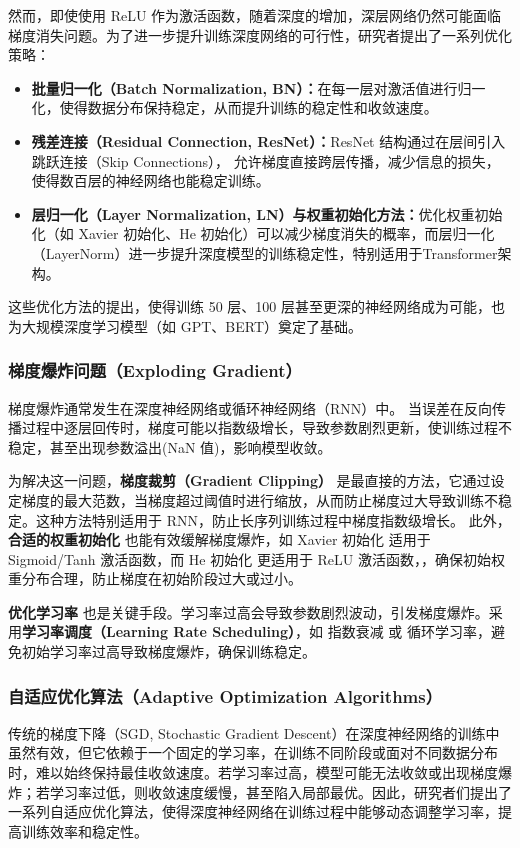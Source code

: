 然而，即使使用 ReLU 作为激活函数，随着深度的增加，深层网络仍然可能面临梯度消失问题。为了进一步提升训练深度网络的可行性，研究者提出了一系列优化策略：
\begin{itemize}
\item {\bf  批量归一化（Batch Normalization, BN）：}在每一层对激活值进行归一化，使得数据分布保持稳定，从而提升训练的稳定性和收敛速度。
\item {\bf  残差连接（Residual Connection, ResNet）：}ResNet 结构通过在层间引入跳跃连接（Skip Connections）， 允许梯度直接跨层传播，减少信息的损失，使得数百层的神经网络也能稳定训练。
\item {\bf  层归一化（Layer Normalization, LN）与权重初始化方法：}优化权重初始化（如 Xavier 初始化、He 初始化）可以减少梯度消失的概率，而层归一化（LayerNorm）进一步提升深度模型的训练稳定性，特别适用于Transformer架构。
\end{itemize}
这些优化方法的提出，使得训练 50 层、100 层甚至更深的神经网络成为可能，也为大规模深度学习模型（如 GPT、BERT）奠定了基础。

\subsubsection{梯度爆炸问题（Exploding Gradient）}
梯度爆炸通常发生在深度神经网络或循环神经网络（RNN）中。
当误差在反向传播过程中逐层回传时，梯度可能以指数级增长，导致参数剧烈更新，使训练过程不稳定，甚至出现参数溢出(NaN 值)，影响模型收敛。

为解决这一问题，{\bf 梯度裁剪（Gradient Clipping）} 是最直接的方法，它通过设定梯度的最大范数，当梯度超过阈值时进行缩放，从而防止梯度过大导致训练不稳定。这种方法特别适用于 RNN，防止长序列训练过程中梯度指数级增长。
此外，{\bf 合适的权重初始化} 也能有效缓解梯度爆炸，如 Xavier 初始化 适用于 Sigmoid/Tanh 激活函数，而 He 初始化 更适用于 ReLU 激活函数，，确保初始权重分布合理，防止梯度在初始阶段过大或过小。

{\bf 优化学习率} 也是关键手段。学习率过高会导致参数剧烈波动，引发梯度爆炸。采用{\bf 学习率调度（Learning Rate Scheduling）}，如 指数衰减 或 循环学习率，避免初始学习率过高导致梯度爆炸，确保训练稳定。

\subsubsection{ 自适应优化算法（Adaptive Optimization Algorithms）} 
传统的梯度下降（SGD, Stochastic Gradient Descent）在深度神经网络的训练中虽然有效，但它依赖于一个固定的学习率，在训练不同阶段或面对不同数据分布时，难以始终保持最佳收敛速度。若学习率过高，模型可能无法收敛或出现梯度爆炸；若学习率过低，则收敛速度缓慢，甚至陷入局部最优。因此，研究者们提出了一系列自适应优化算法，使得深度神经网络在训练过程中能够动态调整学习率，提高训练效率和稳定性。

